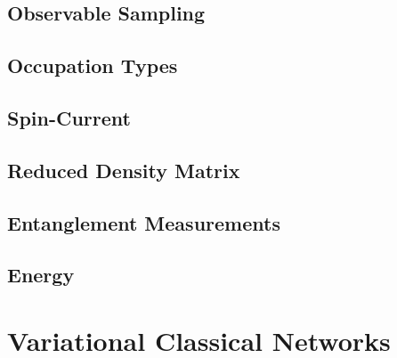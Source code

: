 \documentclass[
headings=optiontohead,              %
12pt,                               %
DIV=13,                             %
twoside=false,                      %
open=right,                         %
BCOR=00mm,                          %
toc=bibliographynumbered            %
]{scrreport}
\begin{document}
        \subsection{Observable Sampling}
        \label{sec:theory-observables-sampling}
        
        \FloatBarrier

        \subsection{Occupation Types}
        \label{sec:theory-observables-occupations}
        
        \FloatBarrier

        \subsection{Spin-Current}
        \label{sec:theory-observables-current}
        
        \FloatBarrier

        \subsection{Reduced Density Matrix}
        \label{sec:theory-observables-density-matrix}
        
        \FloatBarrier
        
        \subsection{Entanglement Measurements}
        \label{sec:theory-observables-entanglement}
        
        \FloatBarrier
        
        \subsection{Energy}
        \label{sec:theory-observables-energy}
        
        \FloatBarrier

    \section{Variational Classical Networks}
    \label{sec:theory-variational-classical-networks}
    
    \FloatBarrier
        
\end{document}

